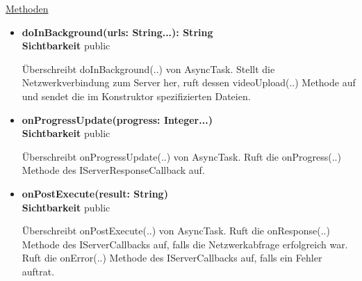 \underline{Methoden}
\begin{itemize}
\itemsep0pt
\item \textbf{doInBackground(urls: String...): String}\hfill\\
\textbf{Sichtbarkeit} public

Überschreibt doInBackground(..) von AsyncTask. Stellt die Netzwerkverbindung zum Server her, ruft dessen videoUpload(..) Methode auf und sendet die im Konstruktor spezifizierten Dateien.

\item \textbf{onProgressUpdate(progress: Integer...)}\hfill\\
\textbf{Sichtbarkeit} public

Überschreibt onProgressUpdate(..) von AsyncTask. Ruft die onProgress(..) Methode des IServerResponseCallback auf.

\item \textbf{onPostExecute(result: String)}\hfill\\
\textbf{Sichtbarkeit} public

Überschreibt onPostExecute(..) von AsyncTask. Ruft die onResponse(..) Methode des IServerCallbacks auf, falls die Netzwerkabfrage erfolgreich war. Ruft die onError(..) Methode des IServerCallbacks auf, falls ein Fehler auftrat.
\end{itemize}
